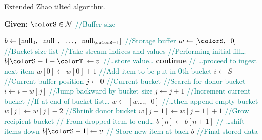\begin{algorithm}[H]
\caption{Extended Zhao tilted algorithm.}
\label{alg:zhao-tilted-full}
\begin{minipage}{0.5\textwidth}
    \hspace*{\algorithmicindent} \textbf{Given:} $\colorS \in \mathcal{N}$ \textcolor{teal}{\small//Buffer size}
    \hspace*{\algorithmicindent}    \begin{algorithmic}[1]
        \State $b \gets [\mathrm{null}_0,\;\; \mathrm{null}_1, \;\; \ldots, \;\; \mathrm{null}_{\colorS - 1}]$ \textcolor{teal}{\small//Storage buffer}
        \State $w \gets [\colorS, \;\; 0]$ \textcolor{teal}{\small//Bucket size list}
         \textcolor{teal}{\small//Take stream indices and values}
         \textcolor{teal}{\small//Performing initial fill\ldots}
        \State $b[\colorS - 1 - \colorT] \gets v$ \textcolor{teal}{\small//\ldots store value\ldots}
        \State \textbf{continue} \textcolor{teal}{\small// \ldots proceed to ingest next item}
        \EndIf
        \State $w[0] \gets w[0] + 1$  \textcolor{teal}{\small//Add item to be put in 0th bucket}
        \State $i \gets S$ \textcolor{teal}{\small//Current buffer position}
        \State $j \gets 0$ \textcolor{teal}{\small//Current bucket}
         \textcolor{teal}{\small//Search for donor bucket}
        \State $i \gets i - w[j]$ \textcolor{teal}{\small//Jump backward by bucket size}
        \State $j \gets j + 1$ \textcolor{teal}{\small//Increment current bucket}
         \textcolor{teal}{\small//If at end of bucket list\ldots}
        \State $w \gets [w\ldots,\;\; 0]$ \textcolor{teal}{\small//\ldots then append empty bucket}
        \EndIf
        \EndWhile
        \State $w[j] \gets w[j] - 2$ \textcolor{teal}{\small //Shrink donor bucket}
        \State $w[j + 1] \gets w[j + 1] + 1$ \textcolor{teal}{\small //Grow recipient bucket}
        \For{$n \in [i \twodots \colorS)$} \textcolor{teal}{\small//
        From dropped item to end\ldots}
        \State $b[n] \gets b[n + 1]$ \textcolor{teal}{\small// \ldots shift items down}
        \EndFor
        \State $b[\colorS - 1] \gets v$ \textcolor{teal}{\small// Store new item at back}
        \EndFor
        \Return $b$ \textcolor{teal}{\small//Final stored data}
    \end{algorithmic}
\end{minipage}
\end{algorithm}
